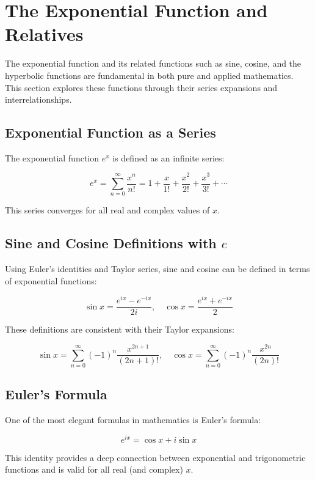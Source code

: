 \newpage
\section{The Exponential Function and Relatives}

The exponential function and its related functions such as sine, cosine, and the hyperbolic functions 
are fundamental in both pure and applied mathematics. This section explores these functions through their 
series expansions and interrelationships.

\subsection{Exponential Function as a Series}

The exponential function \(e^x\) is defined as an infinite series:

\[
    e^x = \sum_{n=0}^{\infty} \frac{x^n}{n!}
    = 1 + \frac{x}{1!} + \frac{x^2}{2!} + \frac{x^3}{3!} + \cdots
\]

This series converges for all real and complex values of \(x\).

\subsection{Sine and Cosine Definitions with \texorpdfstring{\(e\)}{e}}

Using Euler's identities and Taylor series, sine and cosine can be defined in terms of exponential 
functions:

\[
    \sin x = \frac{e^{ix} - e^{-ix}}{2i}, \quad
    \cos x = \frac{e^{ix} + e^{-ix}}{2}
\]

These definitions are consistent with their Taylor expansions:

\[
    \sin x = \sum_{n=0}^{\infty} {(-1)}^n \frac{x^{2n+1}}{(2n+1)!}, \quad
    \cos x = \sum_{n=0}^{\infty} {(-1)}^n \frac{x^{2n}}{(2n)!}
\]

\subsection{Euler's Formula}

One of the most elegant formulas in mathematics is Euler’s formula:

\[
    e^{ix} = \cos x + i\sin x
\]

This identity provides a deep connection between exponential and trigonometric functions and is valid 
for all real (and complex) \(x\).

